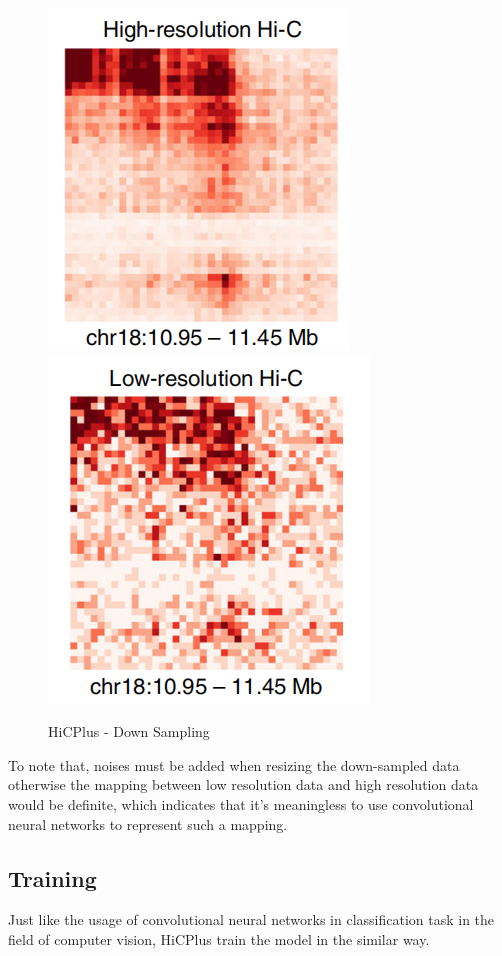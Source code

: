 \documentclass{article}
\begin{document}
\begin{figure}[H]
    \centering
    \includegraphics[scale=0.3]{./docs/hicplus_highres.png}
    \includegraphics[scale=0.3]{./docs/hicplus_lowres.png}
    \caption{HiCPlus - Down Sampling}\label{downsampling}
\end{figure}

To note that, noises must be added when resizing the down-sampled data otherwise the mapping between low resolution data and high resolution data would be definite, which indicates that it's meaningless to use convolutional neural networks to represent such a mapping.

\subsection{Training}

Just like the usage of convolutional neural networks in classification task in the field of computer vision, HiCPlus train the model in the similar way.
\end{document}
